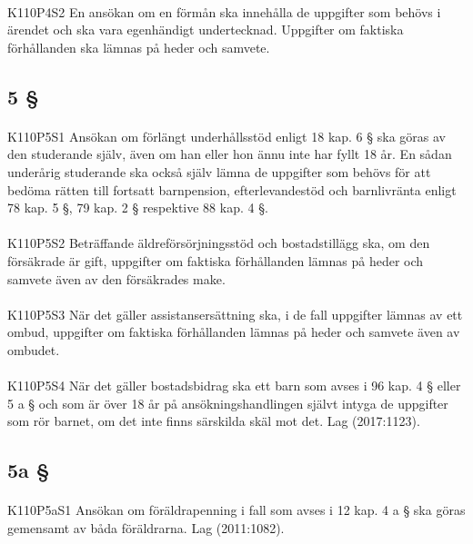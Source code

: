 \documentclass[a4paper,notitlepage,openany,10pt]{book}
\begin{document}
\paragraph*{}
{\tiny K110P4S2}
En ansökan om en förmån ska innehålla de uppgifter som behövs i ärendet och ska vara egenhändigt undertecknad. Uppgifter om faktiska förhållanden ska lämnas på heder och samvete.
\subsection*{5 §}
\paragraph*{}
{\tiny K110P5S1}
Ansökan om förlängt underhållsstöd enligt 18 kap. 6 § ska göras av den studerande själv, även om han eller hon ännu inte har fyllt 18 år. En sådan underårig studerande ska också själv lämna de uppgifter som behövs för att bedöma rätten till fortsatt barnpension, efterlevandestöd och barnlivränta enligt 78 kap. 5 §, 79 kap. 2 § respektive 88 kap. 4 §.
\paragraph*{}
{\tiny K110P5S2}
Beträffande äldreförsörjningsstöd och bostadstillägg ska, om den försäkrade är gift, uppgifter om faktiska förhållanden lämnas på heder och samvete även av den försäkrades make.
\paragraph*{}
{\tiny K110P5S3}
När det gäller assistansersättning ska, i de fall uppgifter lämnas av ett ombud, uppgifter om faktiska förhållanden lämnas på heder och samvete även av ombudet.
\paragraph*{}
{\tiny K110P5S4}
När det gäller bostadsbidrag ska ett barn som avses i 96 kap. 4 § eller 5 a § och som är över 18 år på ansökningshandlingen självt intyga de uppgifter som rör barnet, om det inte finns särskilda skäl mot det.
Lag (2017:1123).
\subsection*{5a §}
\paragraph*{}
{\tiny K110P5aS1}
Ansökan om föräldrapenning i fall som avses i 12 kap. 4 a § ska göras gemensamt av båda föräldrarna.
Lag (2011:1082).
\end{document}
